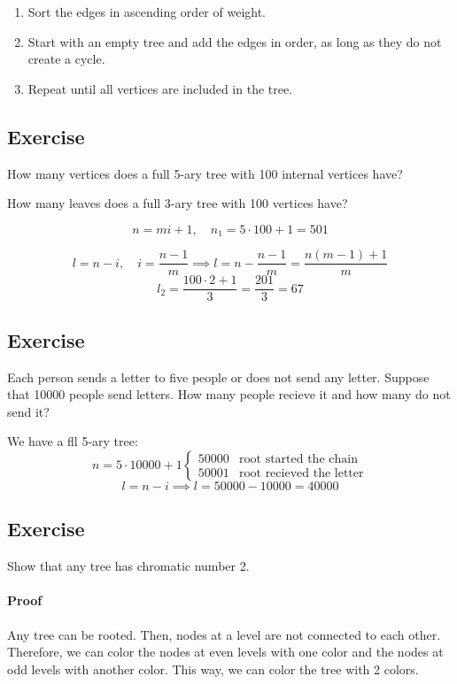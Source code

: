\documentclass[11pt]{article}
\begin{document}
\begin{enumerate}
    \item Sort the edges in ascending order of weight.
    \item Start with an empty tree and add the edges in order, as long as they do not create a cycle.
    \item Repeat until all vertices are included in the tree.
\end{enumerate}

\subsection*{Exercise}
How many vertices does a full 5-ary tree with 100 internal vertices have?

How many leaves does a full 3-ary tree with 100 vertices have?

\[
n = mi + 1, \quad n_1 = 5 \cdot 100 + 1 = 501
\]

\[
l = n - i, \quad i = \frac{n - 1}{m} \implies l = n - \frac{n - 1}{m} = \frac{n(m - 1) + 1}{m}
\]
\[
  l_2 = \frac{100 \cdot 2 + 1}{3} = \frac{201}{3} = 67
\]

\subsection*{Exercise}
Each person sends a letter to five people or does not send any letter. Suppose that 10000 people send letters. How many people recieve it and how many do not send it?

We have a fll 5-ary tree:
\[
n = 5 \cdot 10000 + 1 \begin{cases}
50000 & \text{root started the chain} \\
50001 & \text{root recieved the letter} 
\end{cases}
\]
\[
l = n - i \implies l = 50000 - 10000 = 40000
\]

\subsection*{Exercise}
Show that any tree has chromatic number 2.
\paragraph{Proof}    
Any tree can be rooted. Then, nodes at a level are not connected to each other. Therefore, we can color the nodes at even levels with one color and the nodes at odd levels with another color. This way, we can color the tree with 2 colors.
\end{document}

